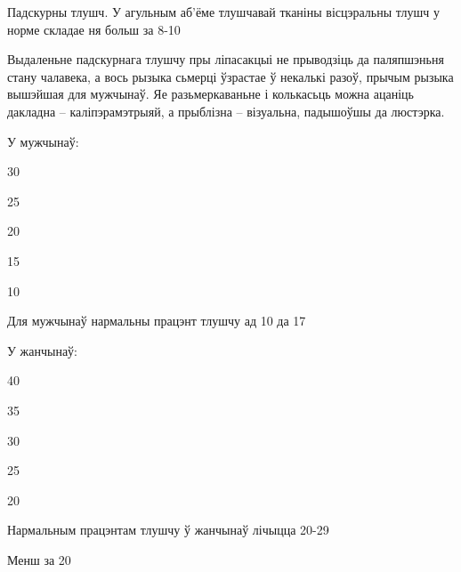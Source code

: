 Падскурны тлушч. У агульным аб'ёме тлушчавай тканіны вісцэральны тлушч у норме складае ня больш за 8-10%

Выдаленьне падскурнага тлушчу пры ліпасакцыі не прыводзіць да паляпшэньня стану чалавека, а вось рызыка сьмерці ўзрастае ў некалькі разоў, прычым рызыка вышэйшая для мужчынаў. Яе разьмеркаваньне і колькасьць можна ацаніць дакладна – каліпэрамэтрыяй, а прыблізна – візуальна, падышоўшы да люстэрка.

У мужчынаў:

30%

25%

20%

15%

10%

Для мужчынаў нармальны працэнт тлушчу ад 10 да 17%

У жанчынаў:

40%

35%

30%

25%

20%

Нармальным працэнтам тлушчу ў жанчынаў лічыцца 20-29%

Менш за 20%

